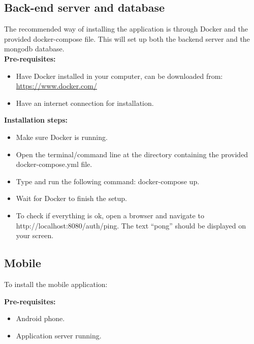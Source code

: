 \subsection{Back-end server and database}
The recommended way of installing the application is through Docker and the provided docker-compose file. This will set up both the backend server and the mongodb database.\\

\textbf{Pre-requisites:}
\begin{itemize}[label={\textbf{-}}]
    \item 
    Have Docker installed in your computer, can be downloaded from: \url{https://www.docker.com/}
    \item 
    Have an internet connection for installation.
\end{itemize}

\textbf{Installation steps:}
\begin{itemize}[label={\textbf{-}}]
    \item 
    Make sure Docker is running.
    \item 
    Open the terminal/command line at the directory containing the provided docker-compose.yml file.
    \item 
    Type and run the following command: docker-compose up.
    \item 
    Wait for Docker to finish the setup.
    \item 
    To check if everything is ok, open a browser and navigate to http://localhost:8080/auth/ping. The text “pong” should be displayed on your screen.
\end{itemize}

\subsection{Mobile}
To install the mobile application:

\textbf{Pre-requisites:}
\begin{itemize}[label={\textbf{-}}]
    \item 
    Android phone.
    \item 
    Application server running.
\end{itemize}

